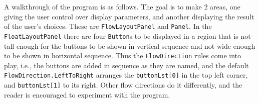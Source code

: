 \documentclass[fsharpNotes.tex]{subfiles}
\begin{document}
A walkthrough of the program is as follows. The goal is to make 2 areas, one giving the user control over display parameters, and another displaying the result of the user's choices. These are \lstinline{FlowLayoutPanel} and \lstinline{Panel}. In the \lstinline{FloatLayoutPanel} there are four \lstinline{Button}s to be displayed in a region that is not tall enough for the buttons to be shown in vertical sequence and not wide enough to be shown in horizontal sequence. Thus the \lstinline{FlowDirection} rules come into play, i.e., the buttons are added in sequence as they are named, and the default \lstinline{FlowDirection.LeftToRight} arranges the \lstinline{buttonLst[0]} in the top left corner, and \lstinline{buttonLst[1]} to its right. Other flow directions do it differently, and the reader is encouraged to experiment with the program.
\end{document}
